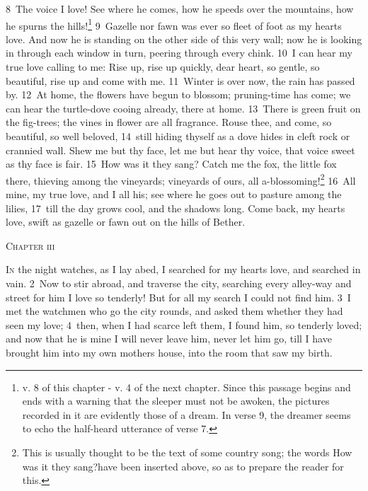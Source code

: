\documentclass[10pt]{book} %
\begin{document}
\textcolor{benred8}{8}~The voice I love! See where he comes, how he speeds over the mountains, how he spurns the hills!\footnote[3]{v. 8 of this chapter - v. 4 of the next chapter. Since this passage begins and ends with a warning that the sleeper must not be awoken, the pictures recorded in it are evidently those of a dream. In verse 9, the dreamer seems to echo the half-heard utterance of verse 7.} \textcolor{benred8}{9}~Gazelle nor fawn was ever so fleet of foot as my heart\textquotesingle s love. And now he is standing on the other side of this very wall; now he is looking in through each window in turn, peering through every chink. \textcolor{benred8}{10}~I can hear my true love calling to me: Rise up, rise up quickly, dear heart, so gentle, so beautiful, rise up and come with me. \textcolor{benred8}{11}~Winter is over now, the rain has passed by. \textcolor{benred8}{12}~At home, the flowers have begun to blossom; pruning-time has come; we can hear the turtle-dove cooing already, there at home. \textcolor{benred8}{13}~There is green fruit on the fig-trees; the vines in flower are all fragrance. Rouse thee, and come, so beautiful, so well beloved, \textcolor{benred8}{14}~still hiding thyself as a dove hides in cleft rock or crannied wall. Shew me but thy face, let me but hear thy voice, that voice sweet as thy face is fair.
\textcolor{benred8}{15}~How was it they sang? Catch me the fox, the little fox there, thieving among the vineyards; vineyards of ours, all a-blossoming!\footnote[4]{This is usually thought to be the text of some country song; the words \textasciigrave How was it they sang?\textquotesingle  have been inserted above, so as to prepare the reader for this.}
\textcolor{benred8}{16}~All mine, my true love, and I all his; see where he goes out to pasture among the lilies, \textcolor{benred8}{17}~till the day grows cool, and the shadows long. Come back, my heart\textquotesingle s love, swift as gazelle or fawn out on the hills of Bether.
\begin{large}\begin{center}\textsc{Chapter iii}\end{center}\end{large}
\lettrine[lines=2]{I}{n} the night watches, as I lay abed, I searched for my heart\textquotesingle s love, and searched in vain. \textcolor{benred8}{2}~Now to stir abroad, and traverse the city, searching every alley-way and street for him I love so tenderly! But for all my search I could not find him. \textcolor{benred8}{3}~I met the watchmen who go the city rounds, and asked them whether they had seen my love; \textcolor{benred8}{4}~then, when I had scarce left them, I found him, so tenderly loved; and now that he is mine I will never leave him, never let him go, till I have brought him into my own mother\textquotesingle s house, into the room that saw my birth.
\end{document}
